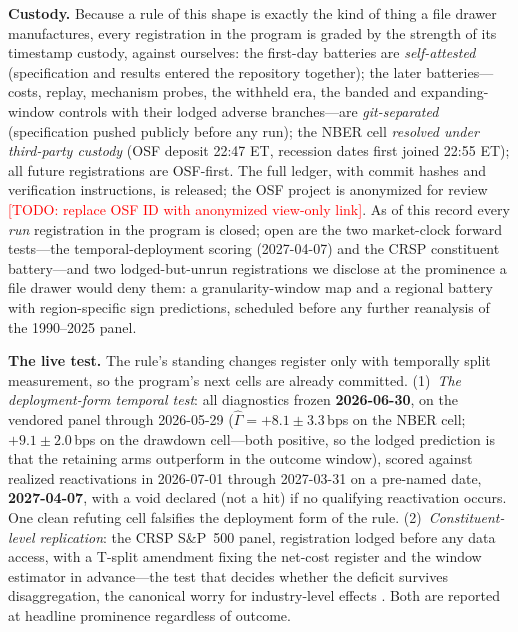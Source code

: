 \documentclass[sigconf,anonymous]{acmart}
\newcommand{\todo}[1]{\textcolor{red}{[TODO: #1]}}
\newcommand{\G}{\hat\Gamma}
\begin{document}
{\sloppy
\textbf{Custody.} Because a rule of this shape is exactly the kind of
thing a file drawer manufactures, every registration in the program is
graded by the strength of its timestamp custody, against ourselves:
the first-day batteries are \emph{self-attested} (specification and
results entered the repository together); the later batteries---costs,
replay, mechanism probes, the withheld era, the banded and
expanding-window controls with their lodged adverse branches---are
\emph{git-separated} (specification pushed publicly before any run);
the NBER cell \emph{resolved under
third-party custody} (OSF deposit 22:47 ET, recession dates first
joined 22:55 ET); all future registrations are
OSF-first. The full ledger, with commit hashes and verification
instructions, is released; the OSF project is anonymized for review
\todo{replace OSF ID with anonymized view-only link}. As of this
record every \emph{run} registration in the
program is closed; open are the two market-clock forward tests---the
temporal-deployment scoring (2027-04-07) and the CRSP constituent
battery---and two lodged-but-unrun registrations we disclose at the
prominence a file drawer would deny them: a granularity-window map and
a regional battery with region-specific sign predictions, scheduled
before any further reanalysis of the 1990--2025 panel.
\par}

\textbf{The live test.} The rule's standing changes register only with
temporally split measurement, so the program's next cells are already
committed. (1)~\emph{The deployment-form temporal test}: all
diagnostics frozen \textbf{2026-06-30}, on the vendored panel through
2026-05-29
($\G = +8.1 \pm 3.3$\,bps on the NBER cell;
$+9.1 \pm 2.0$\,bps on the drawdown cell---both positive, so the
lodged prediction is that the retaining arms outperform in the outcome
window), scored against realized reactivations in 2026-07-01 through
2027-03-31 on a pre-named date, \textbf{2027-04-07}, with a void
declared (not a hit) if no qualifying reactivation occurs. One clean
refuting cell falsifies the deployment form of the rule.
(2)~\emph{Constituent-level replication}: the CRSP S\&P~500 panel,
registration lodged before any data access, with a T-split amendment
fixing the net-cost register and the window estimator in advance---the
test that decides whether the deficit survives disaggregation, the
canonical worry for industry-level effects
\cite{moskowitz1999industries,grundy2001understanding}. Both are
reported at headline prominence regardless of outcome.
\end{document}
